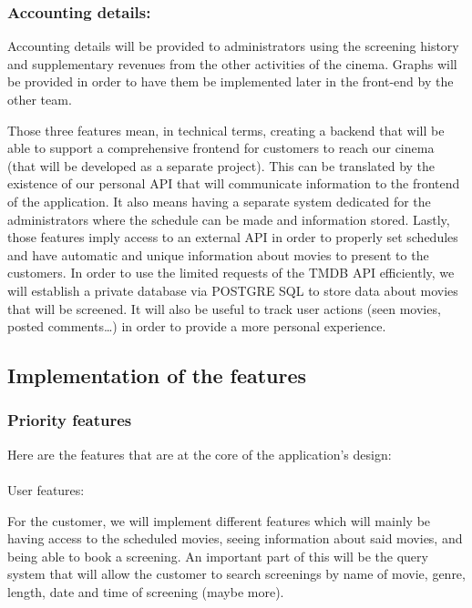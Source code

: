 \documentclass[
  french,
  11pt,
  a4paper,
]{article}
\makeatletter
\let\oldparagraph\paragraph
\renewcommand{\paragraph}{
    \@ifstar
      \xxxParagraphStar
      \xxxParagraphNoStar
  }
\newcommand{\xxxParagraphStar}[1]{\oldparagraph*{#1}\mbox{}}
\newcommand{\xxxParagraphNoStar}[1]{\oldparagraph{#1}\mbox{}}
\makeatother
\begin{document}
\subsubsection{Accounting details:}\label{accounting-details}

Accounting details will be provided to administrators using the
screening history and supplementary revenues from the other activities
of the cinema. Graphs will be provided in order to have them be
implemented later in the front-end by the other team.

Those three features mean, in technical terms, creating a backend that
will be able to support a comprehensive frontend for customers to reach
our cinema (that will be developed as a separate project). This can be
translated by the existence of our personal API that will communicate
information to the frontend of the application. It also means having a
separate system dedicated for the administrators where the schedule can
be made and information stored. Lastly, those features imply access to
an external API in order to properly set schedules and have automatic
and unique information about movies to present to the customers. In
order to use the limited requests of the TMDB API efficiently, we will
establish a private database via POSTGRE SQL to store data about movies
that will be screened. It will also be useful to track user actions
(seen movies, posted comments\ldots) in order to provide a more personal
experience.

\subsection{Implementation of the
features}\label{implementation-of-the-features}

\subsubsection{Priority features}\label{priority-features}

Here are the features that are at the core of the application's design:

\paragraph{User features:}\label{user-features}

For the customer, we will implement different features which will mainly
be having access to the scheduled movies, seeing information about said
movies, and being able to book a screening. An important part of this
will be the query system that will allow the customer to search
screenings by name of movie, genre, length, date and time of screening
(maybe more).
\end{document}
